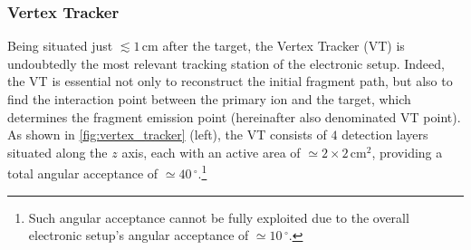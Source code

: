 \subsubsection{Vertex Tracker}\label{sssec:vertex_tracker}
Being situated just $\lesssim1\,\mathrm{cm}$ after the target, the Vertex Tracker (VT) is undoubtedly the most relevant tracking station of the electronic setup. Indeed, the VT is essential not only to reconstruct the initial fragment path, but also to find the interaction point between the primary ion and the target, which determines the fragment emission point (hereinafter also denominated VT point). As shown in \autoref{fig:vertex_tracker} (left), the VT consists of $4$ detection layers situated along the $z$ axis, each with an active area of $\simeq2\times2\,\mathrm{cm}^2$, providing a total angular acceptance of $\simeq40\,^{\circ}$.\footnote{Such angular acceptance cannot be fully exploited due to the overall electronic setup's angular acceptance of $\simeq10\,^{\circ}$.}

